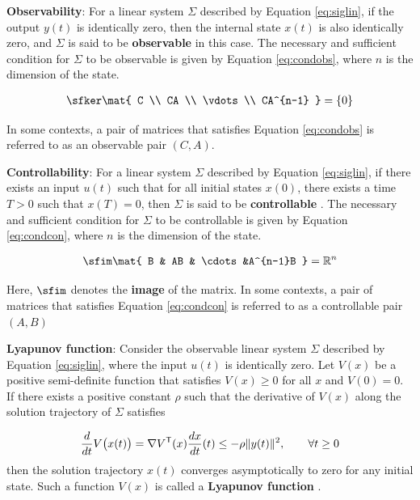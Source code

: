 \documentclass[graybox, envcountchap]{svmult}
\begin{document}
\begin{COLUMN}
\noindent \textbf{Observability}:
For a linear system $\Sigma$ described by Equation \ref{eq:siglin}, if the
output $y(t)$ is identically zero, then the internal state $x(t)$ is also
identically zero, and $\Sigma$ is said to be \textbf{observable}
 in this case. The necessary and sufficient condition for
$\Sigma$ to be observable is given by Equation \ref{eq:condobs}, where $n$ is
the dimension of the state.

\begin{align}\label{eq:condobs}
  \sfker \mat{
  C \\
  CA \\
  \vdots \\
  CA^{n-1}
  }
  =\{0\}
\end{align}

In some contexts, a pair of matrices that satisfies Equation \ref{eq:condobs} is
referred to as an observable pair $(C,A)$.

\smallskip
\noindent \textbf{Controllability}:
For a linear system $\Sigma$ described by Equation \ref{eq:siglin}, if there
exists an input $u(t)$ such that for all initial states $x(0)$, there exists a
time $T>0$ such that $x(T) = 0$, then $\Sigma$ is said to be
\textbf{controllable} . The necessary and sufficient
condition for $\Sigma$ to be controllable is given by Equation \ref{eq:condcon},
where $n$ is the dimension of the state.

\begin{align}\label{eq:condcon}
\sfim \mat{
B & AB & \cdots &A^{n-1}B
}
= \mathbb{R}^n
\end{align}

Here, $\sfim$ denotes the \textbf{image}  of the matrix. In some
contexts, a pair of matrices that satisfies Equation \ref{eq:condcon} is
referred to as a controllable pair $(A,B)$

\smallskip
\noindent \textbf{Lyapunov function}:
Consider the observable linear system $\Sigma$ described by Equation
\ref{eq:siglin}, where the input $u(t)$ is identically zero. Let $V(x)$ be a
positive semi-definite function that satisfies $V(x)\geq 0$ for all $x$ and
$V(0)=0$. If there exists a positive constant $\rho$ such that the derivative of
$V(x)$ along the solution trajectory of $\Sigma$ satisfies

\[
  \frac{d}{dt} V \bigl( x (t) \bigr) 
  =
  \nabla V^{\sf T}(x) \frac{d x}{dt} (t)
  \leq  - \rho \|y(t)\|^2,\qquad
  \forall t \geq0
\]
then the solution trajectory $x(t)$ converges asymptotically to zero for any initial state.
Such a function $V(x)$ is called a \textbf{Lyapunov function} .


\end{COLUMN}
\end{document}
